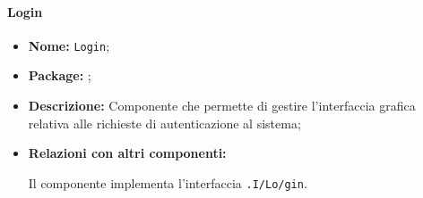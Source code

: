 \paragraph{Login}
\begin{flushleft}
\begin{itemize}
\item \textbf{Nome:} \texttt{Login};
\item \textbf{Package:} \texttt{\view{}};
\item \textbf{Descrizione:} Componente che permette di gestire l'interfaccia grafica relativa alle richieste di autenticazione al sistema;
\item \textbf{Relazioni con altri componenti:}
\begin{sloppypar}
Il componente implementa l'interfaccia \texttt{\view{}.I\fshyp{}Lo\fshyp{}gin}.
\end{sloppypar}
\end{itemize}
\end{flushleft}



